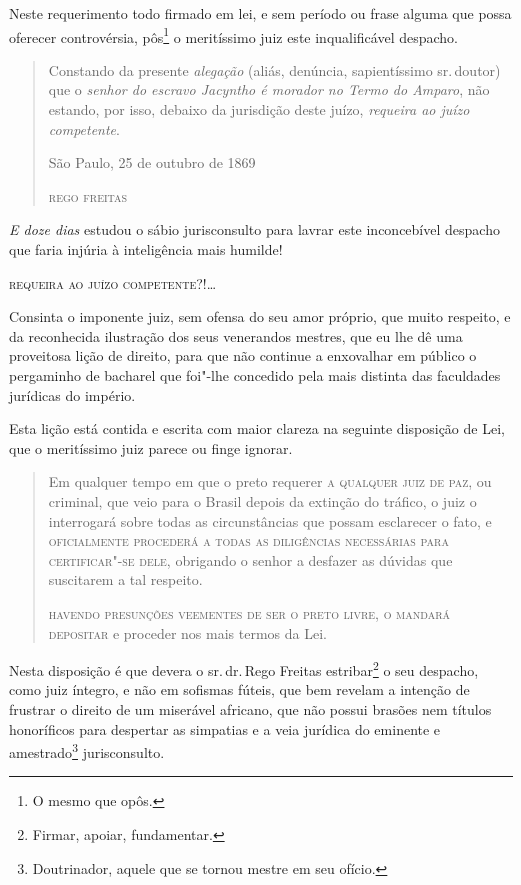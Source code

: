 Neste requerimento todo firmado em lei, e sem período ou frase alguma
que possa oferecer controvérsia, pôs\footnote{O mesmo que opôs.} o
meritíssimo juiz este inqualificável despacho.

\begin{quote}
Constando da presente \emph{alegação} (aliás, denúncia, sapientíssimo
sr.\,doutor) que o \emph{senhor do escravo Jacyntho é morador no Termo do
Amparo}, não estando, por isso, debaixo da jurisdição deste juízo,
\emph{requeira ao juízo competente}.

\noindent{}São Paulo, 25 de outubro de 1869

\noindent\textsc{rego freitas}
\end{quote}

\emph{E doze dias} estudou o sábio jurisconsulto para lavrar este
inconcebível despacho que faria injúria à inteligência mais humilde!

\textsc{requeira ao juízo competente?!}\ldots{}

Consinta o imponente juiz, sem ofensa do seu amor próprio, que muito
respeito, e da reconhecida ilustração dos seus venerandos mestres, que
eu lhe dê uma proveitosa lição de direito, para que não continue a
enxovalhar em público o pergaminho de bacharel que foi"-lhe concedido
pela mais distinta das faculdades jurídicas do império.

Esta lição está contida e escrita com maior clareza na seguinte
disposição de Lei, que o meritíssimo juiz parece ou finge ignorar.

\begin{quote}
Em qualquer tempo em que o preto requerer \textsc{a qualquer juiz de paz}, ou
criminal, que veio para o Brasil depois da extinção do tráfico, o juiz o
interrogará sobre todas as circunstâncias que possam esclarecer o fato,
e \textsc{oficialmente procederá a todas as diligências necessárias para
certificar"-se dele}, obrigando o senhor a desfazer as dúvidas que
suscitarem a tal respeito.

\textsc{havendo presunções veementes de ser o preto livre, o mandará depositar} e
proceder nos mais termos da Lei.
\end{quote}

Nesta disposição é que devera o sr.\,dr.\,Rego Freitas estribar\footnote{
  Firmar, apoiar, fundamentar.} o seu despacho, como juiz íntegro, e não
em sofismas fúteis, que bem revelam a intenção de frustrar o direito de
um miserável africano, que não possui brasões nem títulos honoríficos
para despertar as simpatias e a veia jurídica do eminente e
amestrado\footnote{Doutrinador, aquele que se tornou mestre em seu
  ofício.} jurisconsulto.

